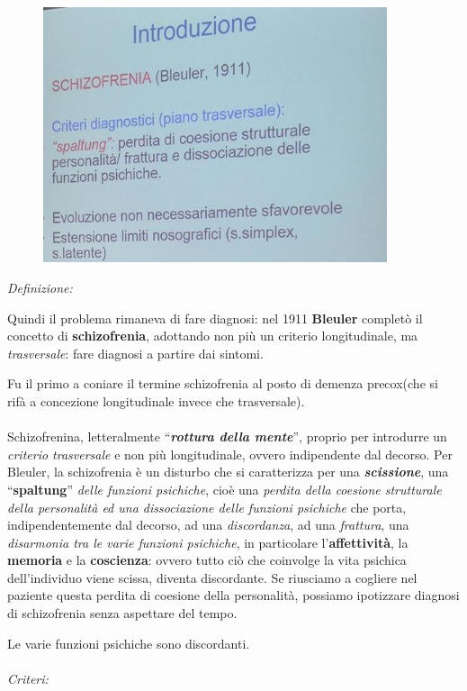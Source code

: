 \begin{figure}[!ht]
\centering
	\includegraphics[width=0.9\textwidth]{06/image1.jpeg}
\end{figure}

\emph{\emph{Definizione:}}

Quindi il problema rimaneva di fare diagnosi: nel 1911 \textbf{Bleuler}
completò il concetto di \textbf{schizofrenia}, adottando non più un
criterio longitudinale, ma \emph{trasversale}: fare diagnosi a partire
dai sintomi.

Fu il primo a coniare il termine schizofrenia al posto di demenza
precox(che si rifà a concezione longitudinale invece che trasversale).
\\\\
Schizofrenina, letteralmente ``\textbf{\emph{rottura della mente}}'',
proprio per introdurre un \emph{criterio trasversale} e non più
longitudinale, ovvero indipendente dal decorso. Per Bleuler, la
schizofrenia è un disturbo che si caratterizza per una
\textbf{\emph{scissione}}, una ``\textbf{spaltung}'' \emph{delle
funzioni psichiche}, cioè una \emph{perdita della coesione strutturale
della personalità ed una dissociazione delle funzioni psichiche} che
porta, indipendentemente dal decorso, ad una \emph{discordanza}, ad una
\emph{frattura}, una \emph{disarmonia tra le varie funzioni psichiche},
in particolare l'\textbf{affettività}, la \textbf{memoria} e la
\textbf{coscienza}: ovvero tutto ciò che coinvolge la vita psichica
dell'individuo viene scissa, diventa discordante. Se riusciamo a
cogliere nel paziente questa perdita di coesione della personalità,
possiamo ipotizzare diagnosi di schizofrenia senza aspettare del tempo.

Le varie funzioni psichiche sono discordanti.
\\\\
\emph{\emph{Criteri:}}

